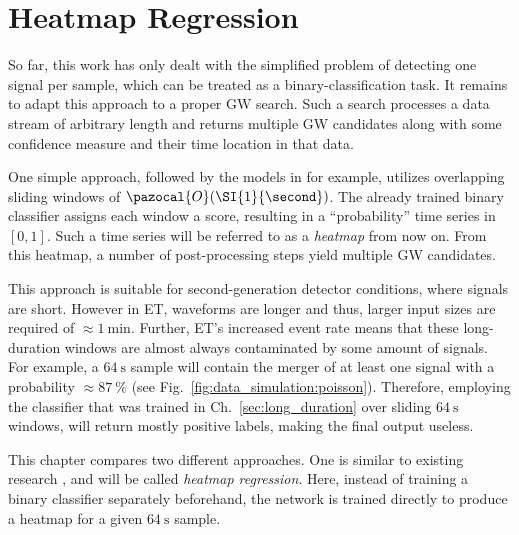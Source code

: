 \chapter{Heatmap Regression}
\label{sec:heatmap}


So far, this work has only dealt with the simplified problem of detecting one signal per sample, which can be treated as a binary-classification task. It remains to adapt this approach to a proper GW search. Such a search processes a data stream of arbitrary length and returns multiple GW candidates along with some confidence measure and their time location in that data.


One simple approach, followed by the models in \cite{Sch_fer_2023} for example, utilizes overlapping sliding windows of $\pazocal{O}(\SI{1}{\second})$. The already trained binary classifier assigns each window a score, resulting in a \enquote{probability} time series in $[0,1]$. Such a time series will be referred to as a \emph{heatmap} from now on. From this heatmap, a number of post-processing steps yield multiple GW candidates.

This approach is suitable for second-generation detector conditions, where signals are short. However in ET, waveforms are longer and thus, larger input sizes are required of $\approx\SI{1}{\minute}$. Further, ET's increased event rate means that these long-duration windows are almost always contaminated by some amount of signals. For example, a $\SI{64}{\second}$ sample will contain the merger of at least one signal with a probability $\approx\SI{87}{\percent}$ (see Fig.~\ref{fig:data_simulation:poisson}). Therefore, employing the classifier that was trained in Ch.~\ref{sec:long_duration} over sliding $\SI{64}{\second}$ windows, will return mostly positive labels, making the final output useless.

This chapter compares two different approaches. One is similar to existing research \cite{PhysRevD.100.063015}, and will be called \emph{heatmap regression}. Here, instead of training a binary classifier separately beforehand, the network is trained directly to produce a heatmap for a given $\SI{64}{\second}$ sample. 

